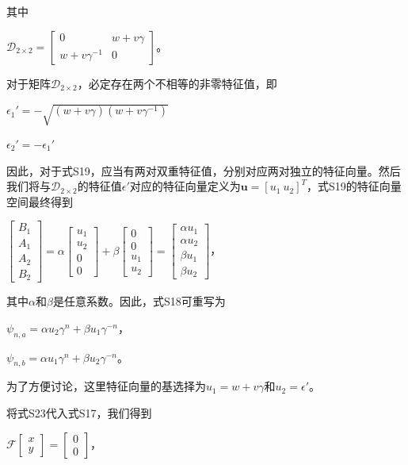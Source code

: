 其中

\(\mathcal{D}_{2\times2}=\begin{bmatrix}0&w + v\gamma\\w + v\gamma^{-1}&0\end{bmatrix}\)。

对于矩阵\(\mathcal{D}_{2\times2}\)，必定存在两个不相等的非零特征值，即

\(\epsilon_{1}' = -\sqrt{(w + v\gamma)(w + v\gamma^{-1})}\)

\(\epsilon_{2}' = -\epsilon_{1}'\)

因此，对于式S19，应当有两对双重特征值，分别对应两对独立的特征向量。然后我们将与\(\mathcal{D}_{2\times2}\)的特征值\(\epsilon'\)对应的特征向量定义为\(\mathbf{u} = [u_{1}\ u_{2}]^{T}\)，式S19的特征向量空间最终得到

\(\begin{bmatrix}B_{1}\\A_{1}\\A_{2}\\B_{2}\end{bmatrix}=\alpha\begin{bmatrix}u_{1}\\u_{2}\\0\\0\end{bmatrix}+\beta\begin{bmatrix}0\\0\\u_{1}\\u_{2}\end{bmatrix}=\begin{bmatrix}\alpha u_{1}\\\alpha u_{2}\\\beta u_{1}\\\beta u_{2}\end{bmatrix}\)，

其中\(\alpha\)和\(\beta\)是任意系数。因此，式S18可重写为

\(\psi_{n,a}=\alpha u_{2}\gamma^{n}+\beta u_{1}\gamma^{-n}\)，

\(\psi_{n,b}=\alpha u_{1}\gamma^{n}+\beta u_{2}\gamma^{-n}\)。

为了方便讨论，这里特征向量的基选择为\(u_{1}=w + v\gamma\)和\(u_{2}=\epsilon'\)。

将式S23代入式S17，我们得到

\(\mathcal{F}\begin{bmatrix}x\\y\end{bmatrix}=\begin{bmatrix}0\\0\end{bmatrix}\)，

